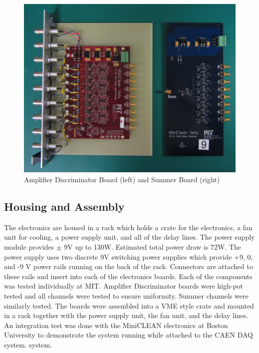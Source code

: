 \documentclass{JINST}
\begin{document}
\begin{figure}[ht]
\begin{center}
\includegraphics[width=5in, keepaspectratio=true]{graphics/boards}
\caption{Amplifier Discriminator Board (left) and Summer Board (right)
\label{fig:boards}}
\end{center}
\end{figure}

\subsection{Housing and Assembly}
\label{sec:Housing}
%
The electronics are housed in a rack which holds a crate for the
electronics, a fan unit for cooling, a power supply unit, and all of
the delay lines.  The power supply module provides $\pm$ 9V up to
130W.  Estimated total power draw is 72W.  The power supply uses two
discrete 9V switching power supplies which provide +9, 0, and -9 V
power rails running on the back of the rack.  Connectors are attached
to these rails and insert into each of the electronics boards.  Each
of the components was tested individually at MIT.  Amplifier
Discriminator boards were high-pot tested and all channels were tested
to ensure uniformity.  Summer channels were similarly tested.  The
boards were assembled into a VME style crate and mounted in a rack
together with the power supply unit, the fan unit, and the delay
lines.  An integration test was done with the MiniCLEAN electronics
at Boston University to
demonstrate the system running while attached to the CAEN DAQ system.
system.
\end{document}
